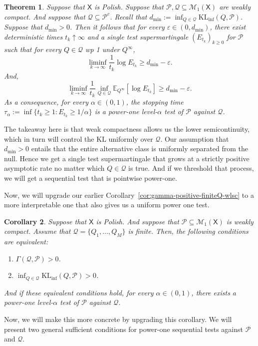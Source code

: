 \documentclass[11pt]{article}
\newcommand{\KL}{\mathrm{KL}}
\newcommand{\KLinf}{\mathrm{KL}_{\mathrm{inf}}}
\newcommand{\E}{\mathbb{E}}
\newcommand{\Pcal}{\mathcal{P}}
\newcommand{\Qcal}{\mathcal{Q}}
\newcommand{\X}{\mathsf{X}}
\newtheorem{theorem}{Theorem}[section]
\newtheorem{corollary}[theorem]{Corollary}
\theoremstyle{definition}
\theoremstyle{definition}
\begin{document}
\begin{theorem}\label{thm:uniform-power-one-compact}
Suppose that $\X$ is Polish. Suppose that $\Pcal,\Qcal\subseteq \mathcal M_1(\X)$ are weakly compact. And suppose that $\Qcal\subseteq\Pcal^c$. Recall that $d_{\min}:=\inf_{Q\in\Qcal}\KLinf(Q,\Pcal)$. Suppose that $d_{\mathrm{min}}>0$. Then it follows that for every $\varepsilon\in (0,d_{\mathrm{min}})$, there exist deterministic times $t_k\uparrow \infty$ and a single test supermartingale $(E_{t_k})_{k\ge 0}$ for $\Pcal$ such that for every $Q\in\Qcal$ wp 1 under $Q^\infty$,
\[
\liminf_{k\to\infty}\frac{1}{t_k}\log E_{t_k} \ge d_{\min}-\varepsilon.
\]
And,
\[
\liminf_{k\to\infty}\frac{1}{t_k}\inf_{Q\in\Qcal}\E_{Q^\infty}[\log E_{t_k}] \ge d_{\min}-\varepsilon.
\]
As a consequence, for every $\alpha\in(0,1)$, the stopping time $\tau_{\alpha}:=\inf\{{t_k}\ge 1: E_{t_k}\ge 1/\alpha\}$ is a power-one level-$\alpha$ test of $\Pcal$ against $\Qcal$.
\end{theorem}

The takeaway here is that weak compactness allows us the lower semicontinuity, which in turn will control the $\KL$ uniformly over $\Qcal$. Our assumption that $d_{\mathrm{min}}>0$ entails that the entire alternative class is uniformly separated from the null. Hence we get a single test supermartingale that grows at a strictly positive asymptotic rate no matter which $Q\in\Qcal$ is true. And if we threshold that process, we will get a sequential test that is pointwise power-one.

Now, we will upgrade our earlier Corollary~\ref{cor:gamma-positive-finiteQ-wlsc} to a more interpretable one that also gives us a uniform power one test.

\begin{corollary}\label{cor:uniform-power-one-finite}
Suppose that $\X$ is Polish. And suppose that $\Pcal\subseteq \mathcal M_1(\X)$ is weakly compact. Assume that $\Qcal=\{Q_1,\dots,Q_M\}$ is finite. Then, the following conditions are equivalent:
\begin{enumerate}
    \item $\Gamma(\Qcal,\Pcal)>0$.
    \item $\inf_{Q\in\Qcal}\KLinf(Q,\Pcal)>0$.
\end{enumerate}
And if these equivalent conditions hold, for every $\alpha\in(0,1)$, there exists a power-one level-$\alpha$ test of $\Pcal$ against $\Qcal$.
\end{corollary}

Now, we will make this more concrete by upgrading this corollary. We will present two general sufficient conditions for power-one sequential tests against $\Pcal$ and $\Qcal$. 
\end{document}
